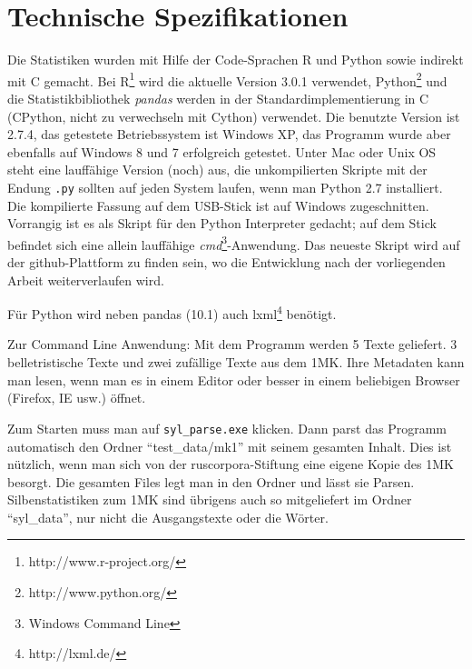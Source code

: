 \documentclass[12pt,headsepline,a4paper]{scrartcl}
\begin{document}
% 
\printbibliography
\newpage

\appendix

\section{Technische Spezifikationen}
\label{sec:tech_spec}
Die Statistiken wurden mit Hilfe der Code-Sprachen R und Python sowie indirekt mit C gemacht. Bei R\footnote{http://www.r-project.org/} wird die aktuelle Version 3.0.1 verwendet, Python\footnote{http://www.python.org/} und die Statistikbibliothek \textsl{pandas} \autocite{mckinney2012} werden in der Standardimplementierung in C (CPython, nicht zu verwechseln mit Cython) verwendet. Die benutzte Version ist 2.7.4, das getestete Betriebssystem ist Windows XP, das Programm 
wurde aber ebenfalls auf Windows 8 und 7 erfolgreich getestet. Unter Mac oder Unix OS steht eine lauffähige Version (noch) aus, die unkompilierten Skripte mit der Endung \texttt{.py} sollten auf jeden System laufen, wenn man Python 2.7 installiert. Die kompilierte Fassung auf dem USB-Stick ist auf Windows zugeschnitten. Vorrangig ist es als Skript für den Python Interpreter gedacht; auf dem Stick befindet sich eine allein lauffähige \textit{cmd}\footnote{Windows Command Line}-Anwendung. Das neueste Skript wird auf der github-Plattform zu finden sein, wo die Entwicklung nach der vorliegenden Arbeit weiterverlaufen wird.

Für Python wird neben pandas (10.1) auch lxml\footnote{http://lxml.de/} benötigt. 

Zur Command Line Anwendung: Mit dem Programm werden 5 Texte geliefert. 3 belletristische Texte und zwei zufällige Texte aus dem 1MK. Ihre Metadaten kann man lesen, wenn man es in einem Editor oder besser in einem beliebigen Browser (Firefox, IE usw.) öffnet. 

Zum Starten muss man auf \texttt{syl\_parse.exe} klicken. Dann parst das Programm automatisch den Ordner "`test\_data/mk1"' mit seinem gesamten Inhalt. Dies ist nützlich, wenn man sich von der ruscorpora-Stiftung eine eigene Kopie des 1MK besorgt. Die gesamten Files legt man in den Ordner und lässt sie Parsen. Silbenstatistiken zum 1MK sind übrigens auch so mitgeliefert im Ordner "`syl\_data"', nur nicht die Ausgangstexte oder die Wörter.
\end{document}
